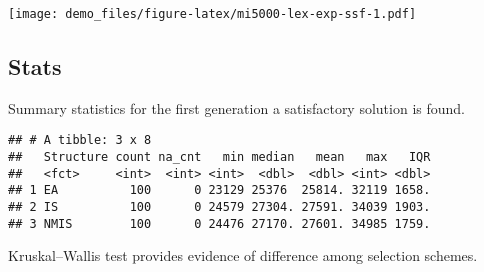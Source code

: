 \documentclass[]{book}
\newenvironment{Shaded}{\begin{snugshade}}{\end{snugshade}}
\newcommand{\CharTok}[1]{\textcolor[rgb]{0.31,0.60,0.02}{#1}}
\newcommand{\DataTypeTok}[1]{\textcolor[rgb]{0.13,0.29,0.53}{#1}}
\newcommand{\DecValTok}[1]{\textcolor[rgb]{0.00,0.00,0.81}{#1}}
\newcommand{\KeywordTok}[1]{\textcolor[rgb]{0.13,0.29,0.53}{\textbf{#1}}}
\newcommand{\NormalTok}[1]{#1}
\newcommand{\OperatorTok}[1]{\textcolor[rgb]{0.81,0.36,0.00}{\textbf{#1}}}
\newcommand{\OtherTok}[1]{\textcolor[rgb]{0.56,0.35,0.01}{#1}}
\newcommand{\StringTok}[1]{\textcolor[rgb]{0.31,0.60,0.02}{#1}}
\begin{document}
\texttt{[image: demo\_files/figure-latex/mi5000-lex-exp-ssf-1.pdf]}

\hypertarget{stats-58}{%
\subsection{Stats}\label{stats-58}}

Summary statistics for the first generation a satisfactory solution is found.

\begin{Shaded}
\end{Shaded}

\begin{verbatim}
## # A tibble: 3 x 8
##   Structure count na_cnt   min median   mean   max   IQR
##   <fct>     <int>  <int> <int>  <dbl>  <dbl> <int> <dbl>
## 1 EA          100      0 23129 25376  25814. 32119 1658.
## 2 IS          100      0 24579 27304. 27591. 34039 1903.
## 3 NMIS        100      0 24476 27170. 27601. 34985 1759.
\end{verbatim}

Kruskal--Wallis test provides evidence of difference among selection schemes.
\end{document}
